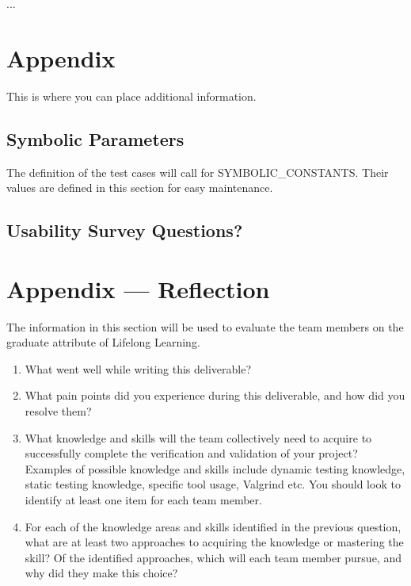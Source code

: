 \documentclass[12pt, titlepage]{article}
\begin{document}
...
				




\newpage

\section{Appendix}

This is where you can place additional information.

\subsection{Symbolic Parameters}

The definition of the test cases will call for SYMBOLIC\_CONSTANTS.
Their values are defined in this section for easy maintenance.

\subsection{Usability Survey Questions?}


\newpage{}
\section*{Appendix --- Reflection}


The information in this section will be used to evaluate the team members on the
graduate attribute of Lifelong Learning.



\begin{enumerate}
  \item What went well while writing this deliverable? 
  \item What pain points did you experience during this deliverable, and how
    did you resolve them?
  \item What knowledge and skills will the team collectively need to acquire to
  successfully complete the verification and validation of your project?
  Examples of possible knowledge and skills include dynamic testing knowledge,
  static testing knowledge, specific tool usage, Valgrind etc.  You should look to
  identify at least one item for each team member.
  \item For each of the knowledge areas and skills identified in the previous
  question, what are at least two approaches to acquiring the knowledge or
  mastering the skill?  Of the identified approaches, which will each team
  member pursue, and why did they make this choice?
\end{enumerate}
\end{document}
